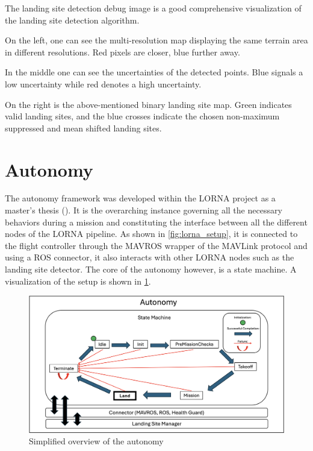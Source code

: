 The landing site detection debug image is a good comprehensive visualization of the landing site detection algorithm. 

On the left, one can see the multi-resolution map displaying the same terrain area in different resolutions. Red pixels are closer, blue further away.

In the middle one can see the uncertainties of the detected points. Blue signals a low uncertainty while red denotes a high uncertainty. 

On the right is the above-mentioned binary landing site map. Green indicates valid landing sites, and the blue crosses indicate the chosen non-maximum suppressed and mean shifted landing sites.   

\section{Autonomy}\label{sec:setup:autonomy}

The autonomy framework was developed within the LORNA project as a master's thesis (\citep{Autonomy}). It is the overarching instance governing all the necessary behaviors during a mission and constituting the interface between all the different nodes of the LORNA pipeline. As shown in \cref{fig:lorna_setup}, it is connected to the flight controller through the MAVROS wrapper of the MAVLink protocol and using a ROS connector, it also interacts with other LORNA nodes such as the landing site detector. The core of the autonomy however, is a state machine. A visualization of the setup is shown in \cref{fig:autonomy}.

\begin{figure}[ht!]
    \centering
    \includegraphics[scale=0.22]{images/system_overview/autonomy.png}
    \caption{Simplified overview of the autonomy}
    \label{fig:autonomy}
\end{figure}

